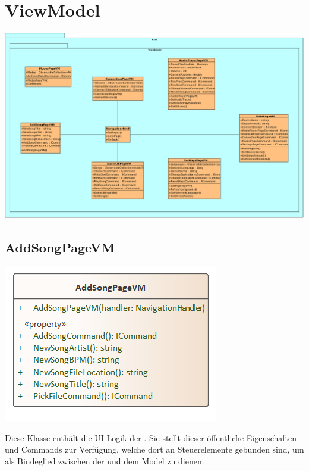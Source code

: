 \documentclass[../entwurf.tex]{subfiles}
\begin{document}
\section{ViewModel}
\includegraphics[scale=0.44,angle=90,origin=c]{../graphics/uml_diagramme/ViewModelDiagram.png}
\subsection{AddSongPageVM}
\begin{minipage}{0.45\textwidth}
\includegraphics[scale=0.75]{../graphics/vm_klassen/AddSongPageVM.png}
\end{minipage}
\begin{minipage}{0.55\textwidth}
Diese Klasse enthält die UI-Logik der . Sie stellt dieser öffentliche Eigenschaften und Commands zur Verfügung, welche dort an Steuerelemente gebunden sind, um als Bindeglied zwischen der  und dem Model zu dienen.
\end{minipage}
\end{document}
